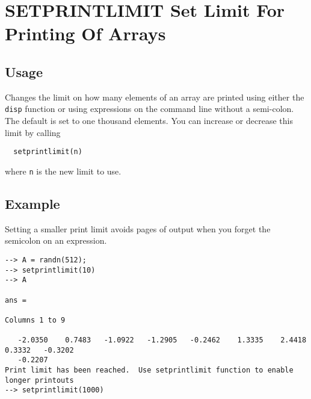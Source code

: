 \section{SETPRINTLIMIT Set Limit For Printing Of Arrays}

\subsection{Usage}

Changes the limit on how many elements of an array are printed
using either the \verb|disp| function or using expressions on the
command line without a semi-colon.  The default is set to 
one thousand elements.  You can increase or decrease this
limit by calling
\begin{verbatim}
  setprintlimit(n)
\end{verbatim}
where \verb|n| is the new limit to use.
\subsection{Example}

Setting a smaller print limit avoids pages of output when you forget the semicolon on an expression.
\begin{verbatim}
--> A = randn(512);
--> setprintlimit(10)
--> A

ans = 
 
Columns 1 to 9

   -2.0350    0.7483   -1.0922   -1.2905   -0.2462    1.3335    2.4418    0.3332   -0.3202 
   -0.2207
Print limit has been reached.  Use setprintlimit function to enable longer printouts
--> setprintlimit(1000)
\end{verbatim}

